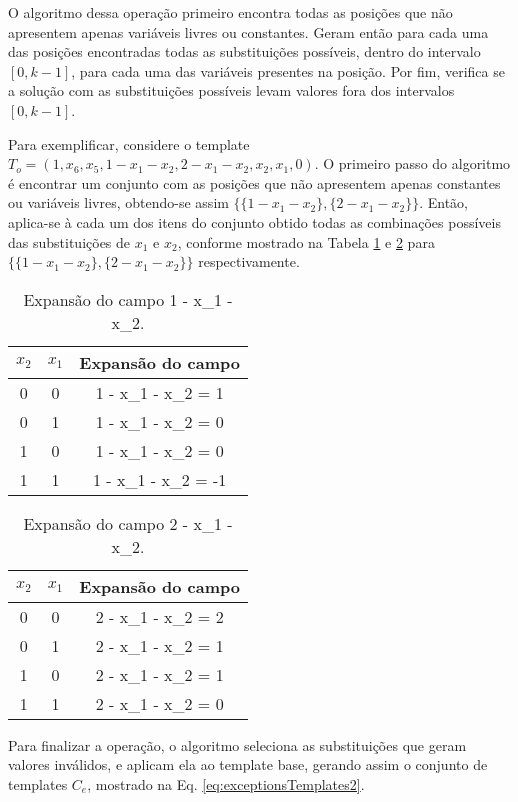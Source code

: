 O algoritmo dessa operação primeiro encontra todas as posições que não apresentem apenas variáveis livres ou constantes. Geram então para cada uma das posições encontradas todas as substituições possíveis, dentro do intervalo $[0,k-1]$, para cada uma das variáveis presentes na posição. Por fim, verifica se a solução com as substituições possíveis levam valores fora dos intervalos $[0,k-1]$.

Para exemplificar, considere o template $T_{o} = (1, x_6, x_5, 1 - x_1 - x_2, 2 - x_1 - x_2, x_2, x_1, 0)$. O primeiro passo do algoritmo é encontrar um conjunto com as posições que não apresentem apenas constantes ou variáveis livres, obtendo-se assim $\{\{1 - x_1 - x_2\}, \{2 - x_1 - x_2\}\}$. Então, aplica-se à cada um dos itens do conjunto obtido todas as combinações possíveis das substituições de $x_1$ e $x_2$, conforme mostrado na Tabela \ref{tab:exceptionProcessA} e \ref{tab:exceptionProcessB} para $\{\{1 - x_1 - x_2\}, \{2 - x_1 - x_2\}\}$ respectivamente.
\begin{table}[h!]
\centering
\caption{Expansão do campo 1 - x_1 - x_2.}
	\begin{tabular}{ccc}
    \toprule
	$x_2$ & $x_1$ & Expansão do campo \\
    \midrule
	0	&	0	&	1 - x_1 - x_2 = 1	\\
	0	&	1	&	1 - x_1 - x_2 = 0	\\
	1	&	0	&	1 - x_1 - x_2 = 0	\\
	1	&	1	&	1 - x_1 - x_2 = -1	\\
    \bottomrule
	\end{tabular}
\label{tab:exceptionProcessA}
\end{table} 

\begin{table}[h!]
\centering
\caption{Expansão do campo 2 - x_1 - x_2.}
	\begin{tabular}{ccc}
    \toprule
	$x_2$ & $x_1$ & Expansão do campo \\
    \midrule
	0	&	0	&	2 - x_1 - x_2 = 2	\\
	0	&	1	&	2 - x_1 - x_2 = 1	\\
	1	&	0	&	2 - x_1 - x_2 = 1	\\
	1	&	1	&	2 - x_1 - x_2 = 0	\\
    \bottomrule
	\end{tabular}
\label{tab:exceptionProcessB}
\end{table}

Para finalizar a operação, o algoritmo seleciona as substituições que geram valores inválidos, e aplicam ela ao template base, gerando assim o conjunto de templates $C_e$, mostrado na  Eq. \ref{eq:exceptionsTemplates2}.

